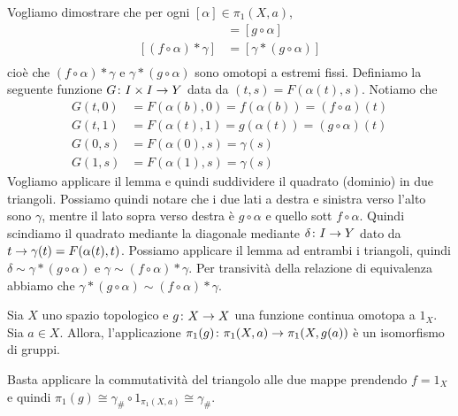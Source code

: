 \documentclass[a4paper]{article}
\begin{document}
\begin{snippetproof}{}
    Vogliamo dimostrare che per ogni \([\alpha] \in \pi_1(X, a)\),
    \begin{align*}
        [i(\gamma) \ast (f \circ \alpha) \ast \gamma] &= [g \circ \alpha] \\
        [(f \circ \alpha) \ast \gamma] &= [\gamma \ast (g\circ \alpha)] \\
    \end{align*}
    cioè che \((f \circ \alpha) \ast \gamma\) e \(\gamma \ast (g \circ \alpha)\)
    sono omotopi a estremi fissi.
    Definiamo la seguente funzione
    \(G \colon I \times I \to Y\) data da \((t,s) = F(\alpha(t), s)\).
    Notiamo che
    \begin{align*}
        G(t,0) &= F(\alpha(b), 0) = f(\alpha(b)) = (f \circ a)(t) \\
        G(t,1) &= F(\alpha(t), 1) = g(\alpha(t)) = (g \circ \alpha)(t) \\
        G(0, s) &= F(\alpha(0), s) = \gamma(s) \\
        G(1, s) &= F(\alpha(1), s) = \gamma(s)
    \end{align*}
    Vogliamo applicare il lemma e quindi suddividere il quadrato (dominio) in due triangoli.
    Possiamo quindi notare che i due lati a destra e sinistra verso l'alto sono \(\gamma\),
    mentre il lato sopra verso destra è \(g \circ \alpha\) e quello sott \(f\circ \alpha\).
    Quindi scindiamo il quadrato mediante la diagonale mediante
    \(\delta \colon I \to Y\) dato da \(t \to \gamma(t) = F(\alpha(t), t)\).
    Possiamo applicare il lemma ad entrambi i triangoli, quindi
    \(\delta \sim \gamma \ast (g \circ \alpha)\) e \(\gamma \sim (f \circ \alpha) \ast \gamma\).
    Per transività della relazione di equivalenza abbiamo che
    \(\gamma \ast (g \circ \alpha) \sim (f \circ \alpha) \ast \gamma\).
\end{snippetproof}

\begin{snippetcorollary}{}
    Sia \(X\) uno spazio topologico e \(g \colon X \to X\)
    una funzione continua omotopa a \(1_X\). Sia \(a \in X\).
    Allora, l'applicazione \(\pi_1(g) \colon \pi_1(X, a) \to \pi_1(X, g(a))\)
    è un isomorfismo di gruppi.
\end{snippetcorollary}

\begin{snippetproof}{}
    Basta applicare la commutatività del triangolo alle due mappe
    prendendo \(f = 1_X\)e quindi \(\pi_1(g) \cong \gamma_{\#} \circ 1_{\pi_1(X, a)} \cong \gamma_{\#}\).
\end{snippetproof}
\end{document}
